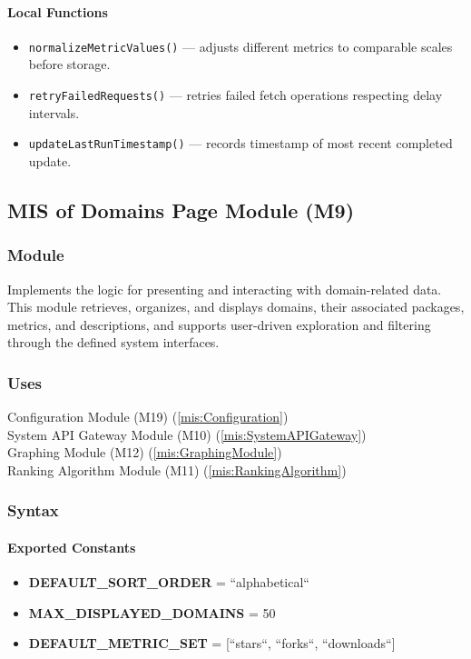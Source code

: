 \documentclass[12pt, titlepage]{article}
\begin{document}
\paragraph{Local Functions}
\begin{itemize}
  \item \texttt{normalizeMetricValues()} — adjusts different metrics to comparable scales before storage.
  \item \texttt{retryFailedRequests()} — retries failed fetch operations respecting delay intervals.
  \item \texttt{updateLastRunTimestamp()} — records timestamp of most recent completed update.
\end{itemize}

\subsection{MIS of Domains Page Module (M9)}
\label{mis:DomainsPage}

\subsubsection{Module}
Implements the logic for presenting and interacting with domain-related data.
This module retrieves, organizes, and displays domains, their associated packages,
metrics, and descriptions, and supports user-driven exploration and filtering
through the defined system interfaces.

\subsubsection{Uses}
Configuration Module (M19)  (\ref{mis:Configuration})\\
System API Gateway Module (M10)  (\ref{mis:SystemAPIGateway})\\
Graphing Module (M12) (\ref{mis:GraphingModule})\\
Ranking Algorithm Module (M11) (\ref{mis:RankingAlgorithm})\\

\subsubsection{Syntax}

\paragraph{Exported Constants}
\begin{itemize}
  \item \textbf{DEFAULT\_SORT\_ORDER} = ``alphabetical``
  \item \textbf{MAX\_DISPLAYED\_DOMAINS} = 50
  \item \textbf{DEFAULT\_METRIC\_SET} = [``stars``, ``forks``, ``downloads``]
\end{itemize}
\end{document}
